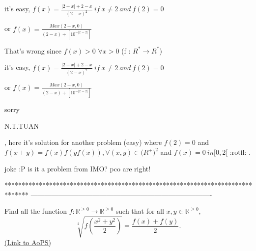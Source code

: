 \begin{mysolution}
	\begin{tcolorbox}it's easy,
$ f(x)=\frac{|2-x|+2-x}{(2-x)^{2}}\ if\ x\neq 2\ and\ f(2)=0$


or $ f(x)=\frac{Max(2-x,0)}{(2-x)+[10^{-|x-2|}]}$  \end{tcolorbox}

That's wrong since $ f(x)>0$ $ \forall x>0$ (f : $ R^{*}\rightarrow R^{*}$)
\end{mysolution}



\begin{mysolution}
	\begin{tcolorbox}it's easy,
$ f(x)=\frac{|2-x|+2-x}{(2-x)^{2}}\ if\ x\neq 2\ and\ f(2)=0$


or $ f(x)=\frac{Max(2-x,0)}{(2-x)+[10^{-|x-2|}]}$  \end{tcolorbox}
sorry \begin{bolded}N.T.TUAN\end{bolded}, here it's solution for another problem (easy) where $ f(2)=0$ and $ f(x+y)=f(x)f(yf(x)),\forall (x,y)\in \mathbb (R^{+})^{2}$
and $ f(x)=0\ in [0,2[$  :rotfl: .
\end{mysolution}



\begin{mysolution}
	joke :P  is it a problem from IMO? pco are right!
\end{mysolution}
*******************************************************************************
-------------------------------------------------------------------------------

\begin{problem}
	Find all the function $f: \mathbb R^{\geq 0} \to \mathbb R^{\geq 0}$ such that for all $x, y \in \mathbb R^{\geq 0}$,
\[\sqrt[2]{f(\frac {x^2+y^2}{2})}=\frac {f(x)+f(y)}{2}.\]
	\flushright \href{https://artofproblemsolving.com/community/c6h42382}{(Link to AoPS)}
\end{problem}



